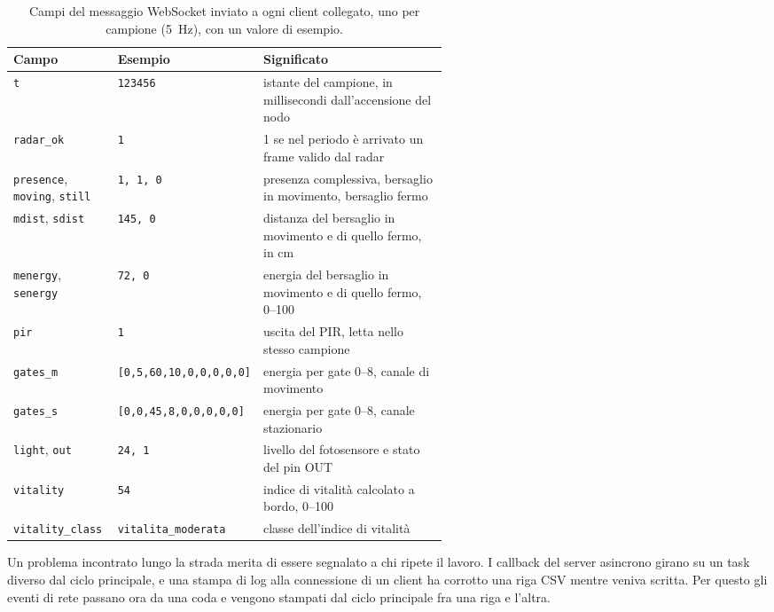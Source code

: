 \begin{table}[!htbp]
\centering
\caption{Campi del messaggio WebSocket inviato a ogni client collegato, uno per campione
(5~Hz), con un valore di esempio.}
\label{tab:webui-messaggio}
\small
\begin{tabularx}{\linewidth}{@{}>{\raggedright\arraybackslash}p{0.24\linewidth}>{\raggedright\arraybackslash}p{0.33\linewidth}X@{}}
\toprule
\textbf{Campo} & \textbf{Esempio} & \textbf{Significato} \\
\midrule
\texttt{t} & \texttt{123456} & istante del campione, in millisecondi dall'accensione del nodo \\
\texttt{radar\_ok} & \texttt{1} & 1 se nel periodo è arrivato un frame valido dal radar \\
\texttt{presence}, \texttt{moving}, \texttt{still} & \texttt{1, 1, 0} & presenza complessiva, bersaglio in movimento, bersaglio fermo \\
\texttt{mdist}, \texttt{sdist} & \texttt{145, 0} & distanza del bersaglio in movimento e di quello fermo, in cm \\
\texttt{menergy}, \texttt{senergy} & \texttt{72, 0} & energia del bersaglio in movimento e di quello fermo, 0--100 \\
\texttt{pir} & \texttt{1} & uscita del PIR, letta nello stesso campione \\
\texttt{gates\_m} & \texttt{[0,5,60,10,0,0,0,0,0]} & energia per gate 0--8, canale di movimento \\
\texttt{gates\_s} & \texttt{[0,0,45,8,0,0,0,0,0]} & energia per gate 0--8, canale stazionario \\
\texttt{light}, \texttt{out} & \texttt{24, 1} & livello del fotosensore e stato del pin OUT \\
\texttt{vitality} & \texttt{54} & indice di vitalità calcolato a bordo, 0--100 \\
\texttt{vitality\_class} & \texttt{vitalita\_moderata} & classe dell'indice di vitalità \\
\bottomrule
\end{tabularx}
\end{table}

Un problema incontrato lungo la strada merita di essere segnalato a chi ripete il lavoro.
I callback del server asincrono girano su un task diverso dal ciclo principale, e una
stampa di log alla connessione di un client ha corrotto una riga CSV mentre veniva
scritta. Per questo gli eventi di rete passano ora da una coda e vengono stampati dal
ciclo principale fra una riga e l'altra.

